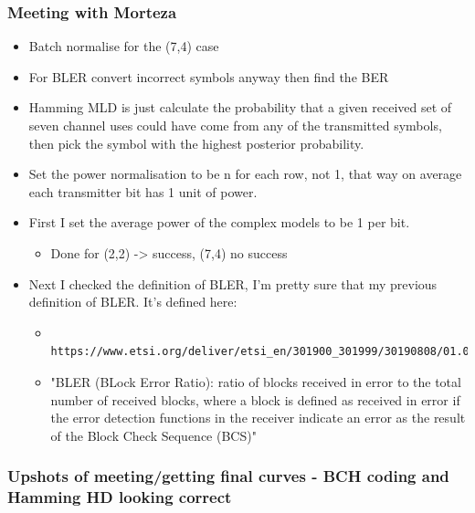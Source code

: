 \documentclass[12pt,onecolumn,letterpaper]{article}
\begin{document}
\subsubsection{Meeting with Morteza}

\begin{itemize}
   \item Batch normalise for the (7,4) case
   \item For BLER convert incorrect symbols anyway then find the BER
   \item Hamming MLD is just calculate the probability that a given received set of seven channel uses could have come from any of the transmitted symbols, then pick the symbol with the highest posterior probability.
   \item Set the power normalisation to be n for each row, not 1, that way on average each transmitter bit has 1 unit of power.
   \item First I set the average power of the complex models to be 1 per bit.
   \begin{itemize}
      \item Done for (2,2) -> success, (7,4) no success
   \end{itemize}
   \item Next I checked the definition of BLER, I'm pretty sure that my previous definition of BLER. It's defined here:
   \begin{itemize}
      \item \begin{verbatim}
         https://www.etsi.org/deliver/etsi_en/301900_301999/30190808/01.01.01_30/en_30190808v010101v.pdfhttps://www.etsi.org/deliver/etsi_en/301900_301999/30190808/01.01.01_30/en_30190808v010101v.pdf
         \end{verbatim}
      \item "BLER (BLock Error Ratio): ratio of blocks received in error to the total number of received blocks, where a block is defined as received in error if the error detection functions in the receiver indicate an error as the result of the Block Check Sequence (BCS)"
   \end{itemize}
\end{itemize}

\subsubsection{Upshots of meeting/getting final curves - BCH coding and Hamming HD looking correct}
\end{document}
